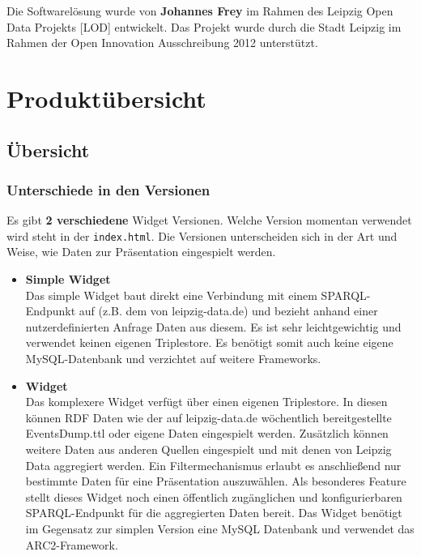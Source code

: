 \documentclass[11pt,a4paper]{article}
\begin{document}
Die Softwarelösung wurde von \textbf{Johannes Frey} im Rahmen des Leipzig Open
Data Projekts [LOD] entwickelt. Das Projekt wurde durch die Stadt Leipzig im
Rahmen der Open Innovation Ausschreibung 2012 unterstützt.

\section{Produktübersicht}

\subsection{Übersicht}

\subsubsection{Unterschiede in den Versionen}

Es gibt \textbf{2 verschiedene} Widget Versionen. Welche Version momentan verwendet wird steht in der \texttt{index.html}.
Die Versionen unterscheiden sich in der Art und Weise, wie Daten zur Präsentation eingespielt werden.
\begin{itemize}
	\item \textbf{Simple Widget}\\
Das simple Widget baut direkt eine Verbindung mit einem SPARQL-Endpunkt auf (z.B. dem von leipzig-data.de) und bezieht anhand einer nutzerdefinierten Anfrage Daten aus diesem. Es ist sehr leichtgewichtig und verwendet keinen eigenen Triplestore. Es benötigt somit auch keine eigene MySQL-Datenbank und verzichtet auf weitere Frameworks.
\item \textbf{Widget} \\
Das komplexere Widget verfügt über einen eigenen Triplestore. In diesen können RDF Daten wie der auf leipzig-data.de wöchentlich bereitgestellte EventsDump.ttl oder eigene Daten eingespielt werden. Zusätzlich können weitere Daten aus anderen Quellen eingespielt und mit denen von Leipzig Data aggregiert werden. Ein Filtermechanismus erlaubt es anschließend nur bestimmte Daten für eine Präsentation auszuwählen. Als besonderes Feature stellt dieses Widget noch einen öffentlich zugänglichen und konfigurierbaren SPARQL-Endpunkt für die aggregierten Daten bereit. Das Widget benötigt im Gegensatz zur simplen Version eine MySQL Datenbank und verwendet das ARC2-Framework.

\end{itemize}
\end{document}
